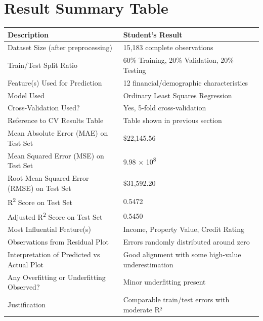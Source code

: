 \documentclass[12pt]{article}
\begin{document}
\section*{Result Summary Table}
\begin{table}[H]
\centering
\begin{tabular}{@{}p{6.5cm}p{7.5cm}@{}}
\toprule
\textbf{Description} & \textbf{Student's Result} \\
\midrule
Dataset Size (after preprocessing) & 15,183 complete observations \\
Train/Test Split Ratio & 60\% Training, 20\% Validation, 20\% Testing \\
Feature(s) Used for Prediction & 12 financial/demographic characteristics \\
Model Used & Ordinary Least Squares Regression \\
Cross-Validation Used? & Yes, 5-fold cross-validation \\
Reference to CV Results Table & Table shown in previous section \\
Mean Absolute Error (MAE) on Test Set & \$22,145.56 \\
Mean Squared Error (MSE) on Test Set & 9.98 × 10\textsuperscript{8} \\
Root Mean Squared Error (RMSE) on Test Set & \$31,592.20 \\
R\textsuperscript{2} Score on Test Set & 0.5472 \\
Adjusted R\textsuperscript{2} Score on Test Set & 0.5450 \\
Most Influential Feature(s) & Income, Property Value, Credit Rating \\
Observations from Residual Plot & Errors randomly distributed around zero \\
Interpretation of Predicted vs Actual Plot & Good alignment with some high-value underestimation \\
Any Overfitting or Underfitting Observed? & Minor underfitting present \\
Justification & Comparable train/test errors with moderate R² \\
\bottomrule
\end{tabular}


\end{table}
\end{document}
